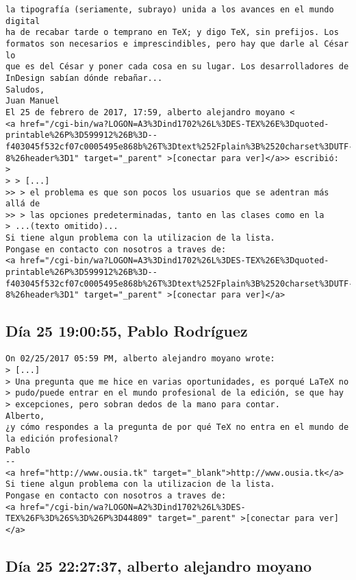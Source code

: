 \documentclass[a4paper,10pt]{article}
\begin{document}
\begin{lstlisting}
la tipografía (seriamente, subrayo) unida a los avances en el mundo digital
ha de recabar tarde o temprano en TeX; y digo TeX, sin prefijos. Los
formatos son necesarios e imprescindibles, pero hay que darle al César lo
que es del César y poner cada cosa en su lugar. Los desarrolladores de
InDesign sabían dónde rebañar...
Saludos,
Juan Manuel
El 25 de febrero de 2017, 17:59, alberto alejandro moyano <
<a href="/cgi-bin/wa?LOGON=A3%3Dind1702%26L%3DES-TEX%26E%3Dquoted-printable%26P%3D599912%26B%3D--f403045f532cf07c0005495e868b%26T%3Dtext%252Fplain%3B%2520charset%3DUTF-8%26header%3D1" target="_parent" >[conectar para ver]</a>> escribió:
>
> > [...]
>> > el problema es que son pocos los usuarios que se adentran más allá de
>> > las opciones predeterminadas, tanto en las clases como en la
> ...(texto omitido)...
Si tiene algun problema con la utilizacion de la lista.
Pongase en contacto con nosotros a traves de:
<a href="/cgi-bin/wa?LOGON=A3%3Dind1702%26L%3DES-TEX%26E%3Dquoted-printable%26P%3D599912%26B%3D--f403045f532cf07c0005495e868b%26T%3Dtext%252Fplain%3B%2520charset%3DUTF-8%26header%3D1" target="_parent" >[conectar para ver]</a>

\end{lstlisting}

\subsection{Día 25 19:00:55, Pablo Rodríguez}

\begin{lstlisting}
On 02/25/2017 05:59 PM, alberto alejandro moyano wrote:
> [...]
> Una pregunta que me hice en varias oportunidades, es porqué LaTeX no
> pudo/puede entrar en el mundo profesional de la edición, se que hay
> excepciones, pero sobran dedos de la mano para contar.
Alberto,
¿y cómo respondes a la pregunta de por qué TeX no entra en el mundo de
la edición profesional?
Pablo
-- 
<a href="http://www.ousia.tk" target="_blank">http://www.ousia.tk</a>
Si tiene algun problema con la utilizacion de la lista.
Pongase en contacto con nosotros a traves de:
<a href="/cgi-bin/wa?LOGON=A2%3Dind1702%26L%3DES-TEX%26F%3D%26S%3D%26P%3D44809" target="_parent" >[conectar para ver]</a>

\end{lstlisting}

\subsection{Día 25 22:27:37, alberto alejandro moyano}
\end{document}
